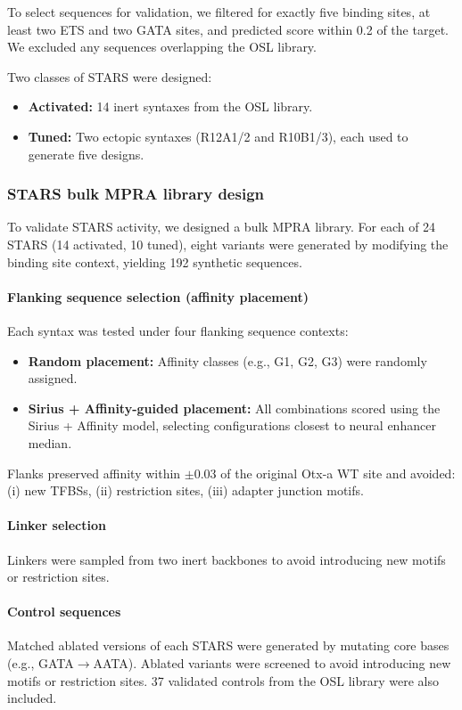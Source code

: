To select sequences for validation, we filtered for exactly five binding sites, at least two ETS and two GATA sites, and predicted score within 0.2 of the target. We excluded any sequences overlapping the OSL library.

Two classes of STARS were designed:
\begin{itemize}
  \item \textbf{Activated:} 14 inert syntaxes from the OSL library.
  \item \textbf{Tuned:} Two ectopic syntaxes (R12A1/2 and R10B1/3), each used to generate five designs.
\end{itemize}

\subsubsection{STARS bulk MPRA library design}
To validate STARS activity, we designed a bulk MPRA library. For each of 24 STARS (14 activated, 10 tuned), eight variants were generated by modifying the binding site context, yielding 192 synthetic sequences.

\paragraph{Flanking sequence selection (affinity placement)}
Each syntax was tested under four flanking sequence contexts:
\begin{itemize}
  \item \textbf{Random placement:} Affinity classes (e.g., G1, G2, G3) were randomly assigned.
  \item \textbf{Sirius + Affinity-guided placement:} All combinations scored using the Sirius + Affinity model, selecting configurations closest to neural enhancer median.
\end{itemize}

Flanks preserved affinity within \(\pm0.03\) of the original Otx-a WT site and avoided: (i) new TFBSs, (ii) restriction sites, (iii) adapter junction motifs.

\paragraph{Linker selection}
Linkers were sampled from two inert backbones to avoid introducing new motifs or restriction sites.

\paragraph{Control sequences}
Matched ablated versions of each STARS were generated by mutating core bases (e.g., GATA\(\rightarrow\)AATA). Ablated variants were screened to avoid introducing new motifs or restriction sites. 37 validated controls from the OSL library were also included.

